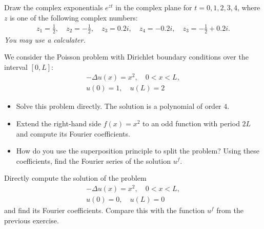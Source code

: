 \documentclass[11pt]{article}
\begin{document}

\begin{exercise}
    Draw the complex exponentials $e^{zt}$ in the complex plane for $t=0,1,2,3,4$, 
    where $z$ is one of the following complex numbers:
    \begin{gather*}
        z_1 = \frac 1 2,
        \quad 
        z_2 = - \frac 1 2,
        \quad 
        z_3 = 0.2i,
        \quad 
        z_4 = -0.2i,
        \quad 
        z_3 = - \frac 1 2 + 0.2i
        .
    \end{gather*}
    \textit{You may use a calculater.}
\end{exercise}

\begin{solution}     
\end{solution}

\begin{exercise}
    We consider the Poisson problem with Dirichlet boundary conditions over the interval $[0,L]$:
    \begin{gather*}
        - \Delta u(x) = x^2, \quad 0 < x < L,
        \\
        u(0) = 1, \quad u(L) = 2
    \end{gather*}
    \begin{itemize}
        \item Solve this problem directly. The solution is a polynomial of order $4$.
        \item Extend the right-hand side $f(x) = x^2$ to an odd function with period $2L$ and compute its Fourier coefficients.
        \item How do you use the superposition principle to split the problem? Using these coefficients, find the Fourier series of the solution $u^f$.
    \end{itemize}
\end{exercise}
\begin{solution}     
\end{solution}

\begin{exercise}[Extra]
    Directly compute the solution of the problem
    \begin{gather*}
        - \Delta u(x) = x^2, \quad 0 < x < L,
        \\
        u(0) = 0, \quad u(L) = 0
    \end{gather*}
    and find its Fourier coefficients. Compare this with the function $u^f$ from the previous exercise.
\end{exercise}
\begin{solution}     
\end{solution}
\end{document}
